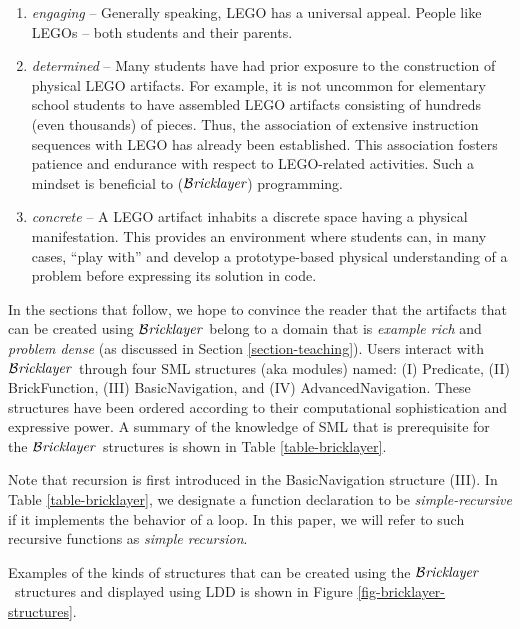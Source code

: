 \documentclass[submission,copyright,creativecommons]{eptcs}
\newcommand{\bricklayer}{\ensuremath{\mathcal{B}\emph{ricklayer}}}
\begin{document}
\begin{enumerate}
\item \emph{engaging} -- Generally speaking, LEGO has a universal appeal. People like LEGOs -- both students and their parents.
\item \emph{determined} -- Many students have had prior exposure to the construction of physical LEGO artifacts. For example, it is not uncommon for elementary school students to have assembled LEGO artifacts consisting of hundreds (even thousands) of pieces. Thus, the association of extensive instruction sequences with LEGO has already been established. This association fosters patience and endurance with respect to LEGO-related activities. Such a mindset is beneficial to (\bricklayer) programming.

\item \emph{concrete} -- A LEGO artifact inhabits a discrete space having a physical manifestation. This provides an environment where students can, in many cases, ``play with'' and develop a prototype-based physical understanding of a problem before expressing its solution in code.

\end{enumerate}


In the sections that follow, we hope to convince the reader that the artifacts that can be created using \bricklayer\ belong to a domain that is \emph{example rich} and \emph{problem dense} (as discussed in Section \ref{section-teaching}). Users interact with \bricklayer\ through four SML structures (aka modules) named: (I) Predicate, (II) BrickFunction, (III) BasicNavigation, and (IV) AdvancedNavigation. These structures have been ordered according to their computational sophistication and expressive power. A summary of the knowledge of SML that is prerequisite for the \bricklayer\ structures is shown in Table \ref{table-bricklayer}.

Note that recursion is first introduced in the BasicNavigation structure (III). In Table \ref{table-bricklayer}, we designate a function declaration to be \emph{simple-recursive} if it implements the behavior of a loop. In this paper, we will refer to such recursive functions as \emph{simple recursion}.

Examples of the kinds of structures that can be created using the \bricklayer\ structures and displayed using LDD is shown in Figure \ref{fig-bricklayer-structures}.

\begin{figure*}[htb!]
\centering
{}

\caption{Artifacts created using Bricklayer and displayed using LDD}\label{fig-bricklayer-structures}
\end{figure*}
\end{document}
